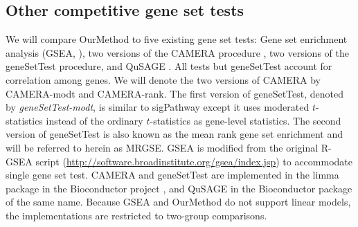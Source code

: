 \documentclass[11pt, a4paper]{article}
\begin{document}
	\subsection{Other competitive gene set tests}
	We will compare OurMethod to five existing gene set tests: Gene set enrichment analysis (GSEA, \cite{subramanian2005gene}), two versions of the CAMERA procedure \citep{wu2012camera}, two versions of the geneSetTest procedure, and QuSAGE \citep{yaari2013quantitative}. All tests but geneSetTest account for correlation among genes. We will denote the two versions of CAMERA by CAMERA-modt and CAMERA-rank. The first version of geneSetTest, denoted by \textit{geneSetTest-modt}, is similar to sigPathway \citep{tian2005discovering} except it uses moderated $t$-statistics instead of the ordinary $t$-statistics as gene-level statistics. The second version of geneSetTest is also known as the mean rank gene set enrichment \citep{michaud2008integrative} and will be referred to herein as MRGSE. GSEA is modified from the original R-GSEA script (\url{http://software.broadinstitute.org/gsea/index.jsp}) to accommodate single gene set test. CAMERA and geneSetTest are implemented  in the limma package \citep{smyth2005limma} in the Bioconductor project \citep{gentleman2004bioconductor}, and QuSAGE in the Bioconductor package of the same name. Because GSEA and OurMethod do not support linear models, the implementations are restricted to two-group comparisons.
	
\end{document}
